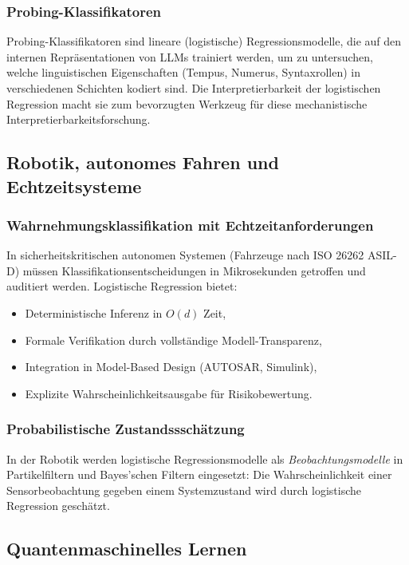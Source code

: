 ﻿\documentclass[12pt, a4paper]{article}
\theoremstyle{definition}
\theoremstyle{remark}
\begin{document}
\subsubsection{Probing-Klassifikatoren}

Probing-Klassifikatoren sind lineare (logistische) Regressionsmodelle, die auf den internen
Repräsentationen von LLMs trainiert werden, um zu untersuchen, welche linguistischen
Eigenschaften (Tempus, Numerus, Syntaxrollen) in verschiedenen Schichten kodiert sind.
Die Interpretierbarkeit der logistischen Regression macht sie zum bevorzugten Werkzeug
für diese mechanistische Interpretierbarkeitsforschung.

\subsection{Robotik, autonomes Fahren und Echtzeitsysteme}

\subsubsection{Wahrnehmungsklassifikation mit Echtzeitanforderungen}

In sicherheitskritischen autonomen Systemen (Fahrzeuge nach ISO 26262 ASIL-D) müssen
Klassifikationsentscheidungen in Mikrosekunden getroffen und auditiert werden. Logistische
Regression bietet:
\begin{itemize}
  \item Deterministische Inferenz in $O(d)$ Zeit,
  \item Formale Verifikation durch vollständige Modell-Transparenz,
  \item Integration in Model-Based Design (AUTOSAR, Simulink),
  \item Explizite Wahrscheinlichkeitsausgabe für Risikobewertung.
\end{itemize}

\subsubsection{Probabilistische Zustandssschätzung}

In der Robotik werden logistische Regressionsmodelle als \emph{Beobachtungsmodelle} in
Partikelfiltern und Bayes'schen Filtern eingesetzt: Die Wahrscheinlichkeit einer Sensorbeobachtung
gegeben einem Systemzustand wird durch logistische Regression geschätzt.

\subsection{Quantenmaschinelles Lernen}
\end{document}
